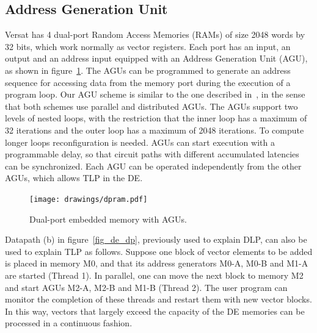 \subsection{Address Generation Unit}
\label{subsection:addressGenerationUnit}

Versat has 4 dual-port Random Access Memories (RAMs) of size 2048
words by 32 bits, which work normally as vector registers. Each port
has an input, an output and an address input equipped with an Address
Generation Unit (AGU), as shown in figure~\ref{fig_dpram}. The AGUs
can be programmed to generate an address sequence for accessing data
from the memory port during the execution of a program loop. Our AGU
scheme is similar to the one described in~\cite{Farahini14}, in the
sense that both schemes use parallel and distributed AGUs. The AGUs
support two levels of nested loops, with the restriction that the
inner loop has a maximum of 32 iterations and the outer loop has a
maximum of 2048 iterations. To compute longer loops reconfiguration is
needed. AGUs can start execution with a programmable delay, so that
circuit paths with different accumulated latencies can be
synchronized. Each AGU can be operated independently from the other
AGUs, which allows TLP in the DE.

\begin{figure}[!htb]
\centering
\texttt{[image: drawings/dpram.pdf]}
\caption{Dual-port embedded memory with AGUs.}
\label{fig_dpram}
\end{figure}

Datapath (b) in figure~\ref{fig_de_dp}, previously used to explain
DLP, can also be used to explain TLP as follows. Suppose one block of
vector elements to be added is placed in memory M0, and that its
address generators M0-A, M0-B and M1-A are started (Thread 1). In
parallel, one can move the next block to memory M2 and start AGUs
M2-A, M2-B and M1-B (Thread 2). The user program can monitor the
completion of these threads and restart them with new vector
blocks. In this way, vectors that largely exceed the capacity of the
DE memories can be processed in a continuous fashion.

